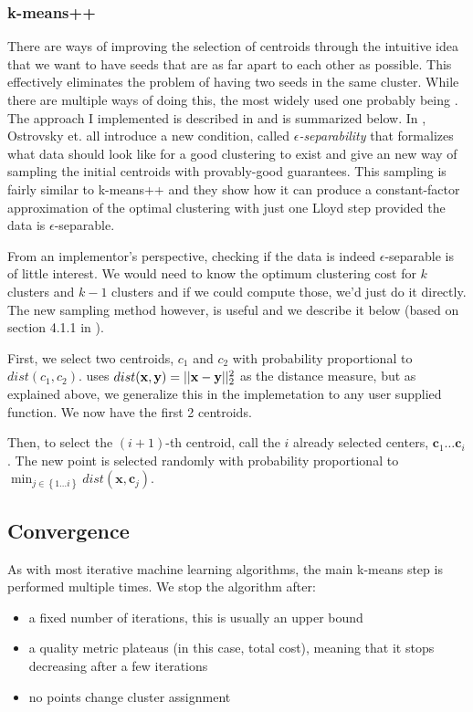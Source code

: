 \documentclass{article}
\begin{document}
\subsubsection{k-means++}
There are ways of improving the selection of centroids through the intuitive
idea that we want to have seeds that are as far apart to each other as
possible. This effectively eliminates the problem of having two seeds in the
same cluster. While there are multiple ways of doing this, the most widely used
one probably being \cite{Arthur2007}. The approach I implemented is described
in \cite{Ostrovsky} and is summarized below. In \cite{Ostrovsky}, Ostrovsky et.
all introduce a new condition, called {\it $\epsilon$-separability} that
formalizes what data should look like for a good clustering to exist and give
an new way of sampling the initial centroids with provably-good guarantees.
This sampling is fairly similar to k-means++ and they show how it can produce a
constant-factor approximation of the optimal clustering with just one Lloyd
step provided the data is $\epsilon$-separable.

From an implementor's perspective, checking if the data is indeed
$\epsilon$-separable is of little interest. We would need to know the optimum
clustering cost for $k$ clusters and $k - 1$ clusters and if we could compute
those, we'd just do it directly.
The new sampling method however, is useful and we describe it below (based
on section 4.1.1 in \cite {Ostrovsky}).

First, we select two centroids, $c_1$ and $c_2$ with probability proportional
to $dist(c_1, c_2)$. \cite{Ostrovsky} uses $dist({\bf x}, {\bf y}) = ||{\bf x -
y}||_2^2$ as the distance measure, but as explained above, we generalize this
in the implemetation to any user supplied function. We now have the first 2
centroids.

Then, to select the $(i + 1)$-th centroid, call the $i$ already selected centers,
$\mathbf{c}_1 \ldots \mathbf{c}_i$. The new point is selected randomly with
probability proportional to $\min_{j \in \left\{ 1 \ldots i \right\}}
dist(\mathbf{x}, \mathbf{c}_j)$.

\subsection{Convergence}

As with most iterative machine learning algorithms, the main k-means step is
performed multiple times. We stop the algorithm after:
\begin{itemize}
    \item a fixed number of iterations, this is usually an upper bound
    \item a quality metric plateaus (in this case, total cost), meaning that
        it stops decreasing after a few iterations
    \item no points change cluster assignment
\end{itemize}
\end{document}
